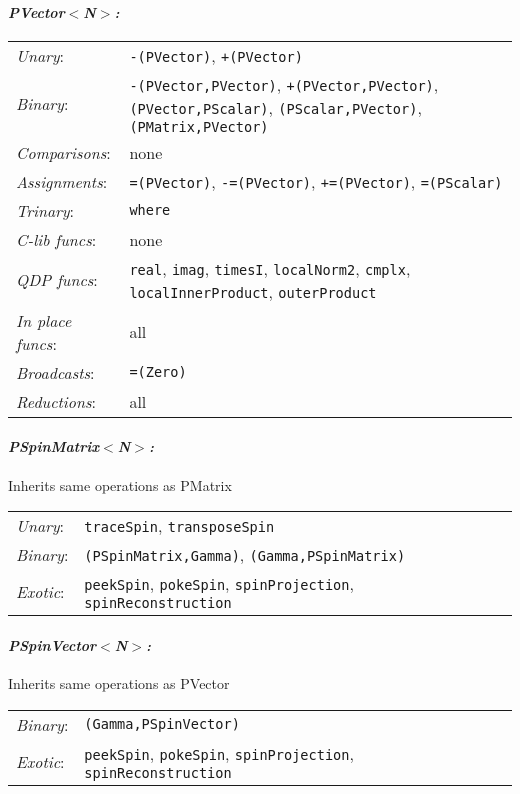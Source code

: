 \documentclass[12pt,letterpaper]{article}
\begin{document}
\paragraph{\bf\em PVector$<$N$>$:}
\begin{flushleft}
  \begin{tabular}{lp{5.0in}}
  {\em Unary}:& {\tt -(PVector)}, {\tt +(PVector)}\\
  {\em Binary}:& {\tt -(PVector,PVector)}, {\tt +(PVector,PVector)}, 
       {\tt *(PVector,PScalar)}, {\tt *(PScalar,PVector)}, {\tt *(PMatrix,PVector)}\\
  {\em Comparisons}:& none\\
  {\em Assignments}:& {\tt =(PVector)}, {\tt -=(PVector)}, {\tt +=(PVector)}, 
       {\tt *=(PScalar)}\\
  {\em Trinary}:& {\tt where}\\
  {\em C-lib funcs}:& none\\
  {\em QDP funcs}:& {\tt real}, {\tt imag}, {\tt timesI}, 
        {\tt localNorm2}, {\tt cmplx}, {\tt localInnerProduct}, {\tt outerProduct}\\
  {\em In place funcs}:& all\\
  {\em Broadcasts}:& {\tt =(Zero)}\\
  {\em Reductions}:& all\\
  \end{tabular}
\end{flushleft}

\paragraph{\bf\em PSpinMatrix$<$N$>$:}
  Inherits same operations as PMatrix
\begin{flushleft}
  \begin{tabular}{lp{5.0in}}
  {\em Unary}:& {\tt traceSpin}, {\tt transposeSpin}\\
  {\em Binary}:& {\tt *(PSpinMatrix,Gamma)}, {\tt *(Gamma,PSpinMatrix)}\\
  {\em Exotic}:& {\tt peekSpin}, {\tt pokeSpin}, {\tt spinProjection}, 
      {\tt spinReconstruction}\\
  \end{tabular}
\end{flushleft}

\paragraph{\bf\em PSpinVector$<$N$>$:}
  Inherits same operations as PVector
\begin{flushleft}
  \begin{tabular}{lp{5.0in}}
  {\em Binary}:& {\tt *(Gamma,PSpinVector)}\\
  {\em Exotic}:& {\tt peekSpin}, {\tt pokeSpin}, {\tt spinProjection}, 
      {\tt spinReconstruction}\\
  \end{tabular}
\end{flushleft}
\end{document}
